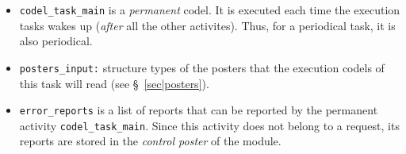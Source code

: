 \begin{itemize}
\item {\tt codel\_task\_main} is a {\em permanent} codel. It is executed each time
the execution tasks wakes  up ({\em after} all the other activites). Thus, for  a  periodical task, it is  also
periodical.

\item {\tt posters\_input:} structure types of the posters that the
execution codels of this task will read (see \S~\vref{sec|posters}).

\item {\tt error\_reports} is a list of reports that can be reported by the
permanent activity {\tt codel\_task\_main}. Since  this activity does not belong to
a request, its  reports are  stored in  the  {\em control poster} of  the
module.
\end{itemize}
